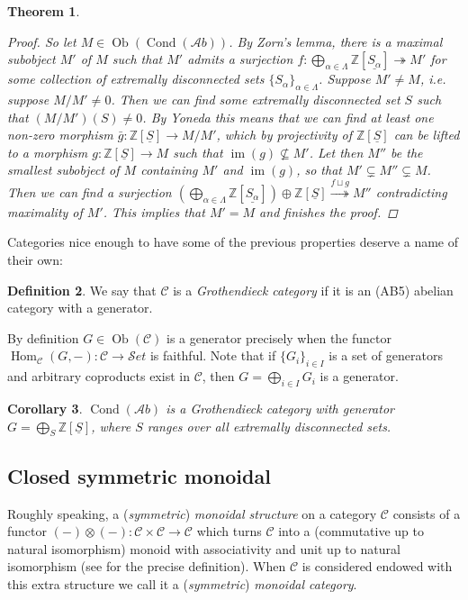 \documentclass[11pt,A4]{article}
\theoremstyle{plain}
\newtheorem{thm}{Theorem}[section]
\newtheorem{cor}[thm]{Corollary}
\theoremstyle{definition}
\newtheorem{defn}[thm]{Definition}
\theoremstyle{remark}
\newcommand{\Z}{\mathbb{Z}}
\newcommand{\1}{\mathbbm{1}}
\newcommand{\C}{\mathscr{C}}
\newcommand{\Ab}{\mathscr{A}b}
\newcommand{\Set}{\mathscr{S}et}
\DeclareMathOperator{\Hom}{Hom}
\DeclareMathOperator{\Cond}{Cond}
\DeclareMathOperator{\Ob}{Ob}
\DeclareMathOperator{\im}{im}
\renewcommand{\u}[1]{\underline{#1}}
\newcommand{\ot}{\otimes}
\newcommand{\op}{\oplus}
\begin{document}
\begin{thm}
\begin{proof}
	So let $M\in \Ob(\Cond(\Ab))$.
	By Zorn's lemma, there is a maximal subobject $M'$ of $M$ such that $M'$ admits a surjection $f\colon \bigoplus_{\alpha\in \Lambda}\Z[\u{S_{\alpha}}]\twoheadrightarrow M'$ for some collection of extremally disconnected sets $\{S_{\alpha}\}_{\alpha\in \Lambda}$.
	Suppose $M'\neq M$, i.e. suppose $M/M'\neq 0$.
	Then we can find some extremally disconnected set $S$ such that $(M/M')(S)\neq 0$.
	By Yoneda this means that we can find at least one non-zero morphism $\bar{g}\colon \Z[\u{S}]\to M/M'$, which by projectivity of $\Z[\u{S}]$ can be lifted to a morphism $g\colon \Z[\u{S}]\to M$ such that $\im(g)\not\subseteq M'$.
	Let then $M''$ be the smallest subobject of $M$ containing $M'$ and $\im(g)$, so that $M'\subsetneq M''\subsetneq M$.
	Then we can find a surjection $(\bigoplus_{\alpha\in \Lambda} \Z[\u{S_{\alpha}}])\op \Z[\u{S}]\overset{f\sqcup g}{\twoheadrightarrow} M''$ contradicting maximality of $M'$.
	This implies that $M'=M$ and finishes the proof.
    \end{proof}
\end{thm}

Categories nice enough to have some of the previous properties deserve a name of their own:

\begin{defn}
    We say that $\C$ is a \textit{Grothendieck category} if it is an (AB5) abelian category with a generator.
\end{defn}

By definition $G\in \Ob(\C)$ is a generator precisely when the functor $\Hom_{\C}(G,-)\colon \C\to \Set$ is faithful.
Note that if $\{G_{i}\}_{i\in I}$ is a set of generators and arbitrary coproducts exist in $\C$, then $G=\bigoplus_{i\in I}G_{i}$ is a generator.

\begin{cor}
    $\Cond(\Ab)$ is a Grothendieck category with generator $G=\bigoplus_{S}\Z[\u{S}]$, where $S$ ranges over all extremally disconnected sets.
\end{cor}

\subsection{Closed symmetric monoidal}

Roughly speaking, a (\textit{symmetric}) \textit{monoidal structure} on a category $\C$ consists of a functor $(-)\ot(-)\colon \C\times \C\to \C$ which turns $\C$ into a (commutative up to natural isomorphism) monoid with associativity and unit up to natural isomorphism (see \cite{nlab:monoidal_category} for the precise definition).
When $\C$ is considered endowed with this extra structure we call it a (\textit{symmetric}) \textit{monoidal category}.
\end{document}
